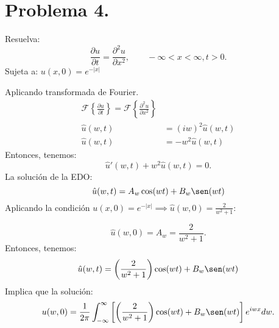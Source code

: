 \section{Problema 4.} Resuelva:
$$\frac{\partial u}{\partial t} = \frac{\partial ^2 u}{\partial x^2}, \qquad -\infty<x<\infty, t>0.$$
Sujeta a: $u(x,0)=e^{-|x|}$

\begin{solution}
	Aplicando transformada de Fourier. 
	\begin{align*}
		\mathcal{F}\left\{\frac{\partial u}{\partial t}\right\}=\mathcal{F}\left\{\frac{\partial ^2 u}{\partial x^2}\right\}\\
		\hat{u}(w,t)&=(iw)^2\hat{u}(w,t) \\
	\hat{u}(w,t)	&= -w^2\hat{u}(w,t)
	\end{align*}
Entonces, tenemos: 
$$\hat{u}'(w,t)+w^2\hat{u}(w,t)=0.$$
La solución de la EDO: 
$$	\hat{u}(w,t)=A_w\cos(wt)+B_w\sen (wt) $$
Aplicando la condición $u(x,0)=e^{-|x|}\implies \hat{u}(w,0)=\frac{2}{w^2+1}$:

$$\hat{u}(w,0)=A_w=\frac{2}{w^2+1}.$$
Entonces, tenemos: 
$$	\hat{u}(w,t)=\left(\frac{2}{w^2+1}\right)\cos(wt)+B_w\sen (wt) $$
Implica que la solución: 
$$u(w,0)=\frac{1}{2\pi}\int_{-\infty}^{\infty}\left[\left(\frac{2}{w^2+1}\right)\cos(wt)+B_w\sen (wt)\right]e^{iwx}dw.$$
\end{solution}